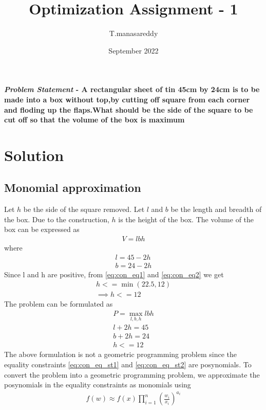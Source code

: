 \documentclass[journal,10pt,twocolumn]{article}
\title{\textbf{Optimization Assignment - 1}}
\author{T.manasareddy}
\date{September 2022}
\providecommand{\brak}[1]{\ensuremath{\left(#1\right)}}
\begin{document}
\maketitle
\paragraph{\textit{Problem Statement} - A rectangular sheet of tin 45cm by 24cm is to be made into a box without top,by cutting off square from each corner and floding up the flaps.What should be the side of the square to be cut off so that the volume of the box is maximum}

\section*{\large Solution}
\subsection*{\normalsize Monomial approximation}
Let $h$ be the side of the square removed. Let $l$ and $b$ be the length and breadth of the box. Due to the construction, $h$ is the height of the box. The volume of the box can be expressed as
\begin{align}
	V = lbh
\end{align}
where
\begin{align}
	\label{eq:con_eq1}
	l = 45 - 2h\\
	\label{eq:con_eq2}
	b = 24 - 2h
\end{align}
Since l and h are positive, from \eqref{eq:con_eq1} and \eqref{eq:con_eq2} we get
\begin{align}
	h <= \min(22.5, 12)\\
	\implies h <= 12
	\label{eq:lt_eq1}
\end{align}
The problem can be formulated as
\begin{align}
	\label{eq:prob_std}
	P = \max_{l,b,h}lbh\\
	\label{eq:con_eq_st1}
	l + 2h = 45\\
	\label{eq:con_eq_st2}
	b + 2h = 24\\
	\label{eq:lt_eq_std}
	h <= 12
\end{align}
The above formulation is not a geometric programming problem since the equality constraints \eqref{eq:con_eq_st1} and \eqref{eq:con_eq_st2} are posynomials. To convert the problem into a geometric programming problem, we approximate the posynomials in the equality constraints as monomials using
\begin{align}
	\label{eq:mono_approx}
	f(w) \approx f(x)\prod_{i=1}^{n}\brak{\frac{w_i}{x_i}}^{a_i}
\end{align}
\end{document}
